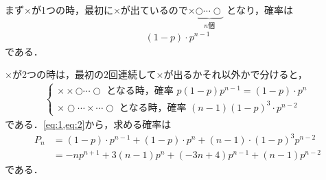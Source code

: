 \documentclass[../../main.tex]{subfiles}
\begin{document}
まず$\times$が1つの時，最初に$\times$が出ているので$\times\underbrace{\bigcirc\cdots\bigcirc}_{n\text{個}}$ となり，確率は
\begin{align}
  (1-p) \cdot p^{n-1} \label{eq:1}
\end{align}
である．

$\times$が2つの時は，最初の$2$回連続して$\times$が出るかそれ以外かで分けると，
\begin{align}
  \begin{cases}
    \times\times\bigcirc\cdots\bigcirc \text{ となる時，確率 } p(1-p)p^{n-1} = (1-p)\cdot p^n \\
    \times\bigcirc\cdots\times\cdots\bigcirc \text{ となる時，確率 }  (n-1)(1-p)^3 \cdot p^{n-2}
  \end{cases} \label{eq:2}
\end{align}
である．\cref{eq:1,eq:2}から，求める確率は
\begin{align}
  P_n
  &= (1-p) \cdot p^{n-1} + (1-p) \cdot p^n + (n-1) \cdot (1-p)^3 p^{n-2} \\
  &= -n p^{n+1} + 3(n-1)p^{n} +(-3n+4)p^{n-1}+(n-1)p^{n-2}
\end{align}
である．
\end{document}
